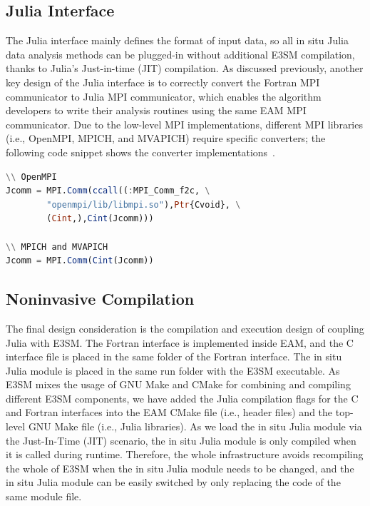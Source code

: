 \documentclass{juliacon}
\begin{document}
\subsection{Julia Interface}

The Julia interface mainly defines the format of input data, so all in situ Julia data analysis methods can be plugged-in without additional E3SM compilation, thanks to Julia's Just-in-time (JIT) compilation.
As discussed previously, another key design of the Julia interface is to correctly convert the Fortran MPI communicator to Julia MPI communicator, which enables the algorithm developers to write their analysis routines using the same EAM MPI communicator. Due to the low-level MPI implementations, different MPI libraries (i.e., OpenMPI, MPICH, and MVAPICH) require specific converters; the following code snippet shows the converter implementations~\cite{gabriel2004open,panda2013mvapich,gropp1996user}.

\begin{minipage}{\linewidth}
\begin{lstlisting}[language = Julia, caption={Juila interface MPI conversion.}]
\\ OpenMPI
Jcomm = MPI.Comm(ccall((:MPI_Comm_f2c, \
        "openmpi/lib/libmpi.so"),Ptr{Cvoid}, \
        (Cint,),Cint(Jcomm)))

\\ MPICH and MVAPICH
Jcomm = MPI.Comm(Cint(Jcomm))
\end{lstlisting}
\end{minipage}


\subsection{Noninvasive Compilation}
The final design consideration is the compilation and execution design of coupling Julia with E3SM. The Fortran interface is implemented inside EAM, and the C interface file is placed in the same folder of the Fortran interface. The in situ Julia module is placed in the same run folder with the E3SM executable. As E3SM mixes the usage of GNU Make and CMake for combining and compiling different E3SM components, we have added the Julia compilation flags for the C and Fortran interfaces into the EAM CMake file (i.e., header files) and the top-level GNU Make file (i.e., Julia libraries). As we load the in situ Julia module via the Just-In-Time (JIT) scenario, the in situ Julia module is only compiled when it is called during runtime. Therefore, the whole infrastructure avoids recompiling the whole of E3SM when the in situ Julia module needs to be changed, and the in situ Julia module can be easily switched by only replacing the code of the same module file.
\end{document}
